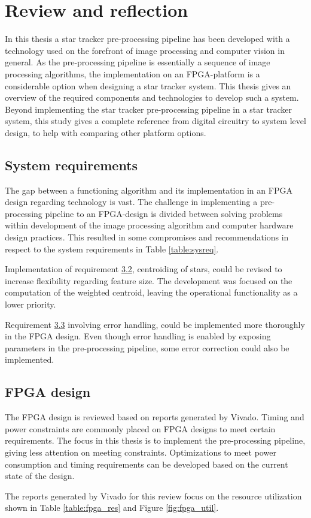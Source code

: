 \documentclass[12pt]{report}
\begin{document}

\chapter{Review and reflection}

In this thesis a star tracker pre-processing pipeline has been developed with a technology used on the forefront of image processing and computer vision in general. As the pre-processing pipeline is essentially a sequence of image processing algorithms, the implementation on an FPGA-platform is a considerable option when designing a star tracker system. This thesis gives an overview of the required components and technologies to develop such a system. Beyond implementing the star tracker pre-processing pipeline in a star tracker system, this study gives a complete reference from digital circuitry to system level design, to help with comparing other platform options. 
\par

\section{System requirements}
The gap between a functioning algorithm and its implementation in an FPGA design regarding technology is vast. The challenge in implementing a pre-processing pipeline to an FPGA-design is divided between solving problems within development of the image processing algorithm and computer hardware design practices. This resulted in some compromises and recommendations in respect to the system requirements in Table \ref*{table:sysreq}.
\par
Implementation of requirement \hyperref[req3.2]{3.2}, centroiding of stars, could be revised to increase flexibility regarding feature size. The development was focused on the computation of the weighted centroid, leaving the operational functionality as a lower priority.
\par
Requirement \hyperref[req3.3]{3.3} involving error handling, could be implemented more thoroughly in the FPGA design. Even though error handling is enabled by exposing parameters in the pre-processing pipeline, some error correction could also be implemented.
\par

\section{FPGA design}
The FPGA design is reviewed based on reports generated by Vivado. Timing and power constraints are commonly placed on FPGA designs to meet certain requirements. The focus in this thesis is to implement the pre-processing pipeline, giving less attention on meeting constraints. Optimizations to meet power consumption and timing requirements can be developed based on the current state of the design.
\par
The reports generated by Vivado for this review focus on the resource utilization shown in Table \ref*{table:fpga_res} and Figure \ref*{fig:fpga_util}.
\end{document}
